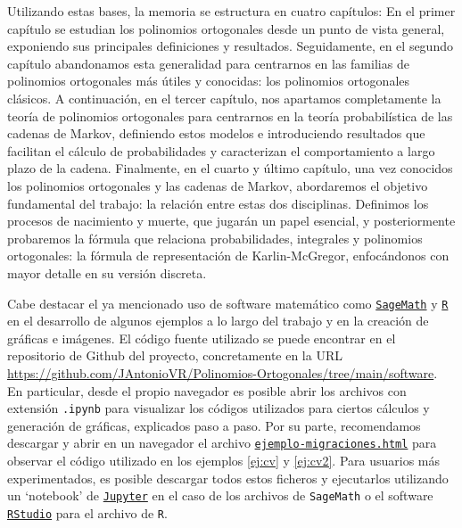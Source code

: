 Utilizando estas bases, la memoria se estructura en cuatro capítulos: En el primer capítulo se estudian los polinomios ortogonales desde un punto de vista general, exponiendo sus principales definiciones y resultados. Seguidamente, en el segundo capítulo abandonamos esta generalidad para centrarnos en las familias de polinomios ortogonales más útiles y conocidas: los polinomios ortogonales clásicos. A continuación, en el tercer capítulo, nos apartamos completamente la teoría de polinomios ortogonales para centrarnos en la teoría probabilística de las cadenas de Markov, definiendo estos modelos e introduciendo resultados que facilitan el cálculo de probabilidades y caracterizan el comportamiento a largo plazo de la cadena. Finalmente, en el cuarto y último capítulo, una vez conocidos los polinomios ortogonales y las cadenas de Markov, abordaremos el objetivo fundamental del trabajo: la relación entre estas dos disciplinas. Definimos los procesos de nacimiento y muerte, que jugarán un papel esencial, y posteriormente probaremos la fórmula que relaciona probabilidades, integrales y polinomios ortogonales: la fórmula de representación de Karlin-McGregor, enfocándonos con mayor detalle en su versión discreta.

Cabe destacar el ya mencionado uso de software matemático como \href{https://www.sagemath.org/}{\texttt{SageMath}} y \href{https://www.r-project.org/}{\texttt{R}} en el desarrollo de algunos ejemplos a lo largo del trabajo y en la creación de gráficas e imágenes. El código fuente utilizado se puede encontrar en el repositorio de Github del proyecto, concretamente en la URL \url{https://github.com/JAntonioVR/Polinomios-Ortogonales/tree/main/software}. En particular, desde el propio navegador es posible abrir los archivos con extensión \texttt{.ipynb} para visualizar los códigos utilizados para ciertos cálculos y generación de gráficas, explicados paso a paso. Por su parte, recomendamos descargar y abrir en un navegador el archivo \href{https://github.com/JAntonioVR/Polinomios-Ortogonales/blob/main/software/ejemplo-migraciones.html}{\texttt{ejemplo-migraciones.html}} para observar el código utilizado en los ejemplos \ref{ej:cv} y \ref{ej:cv2}. Para usuarios más experimentados, es posible descargar todos estos ficheros y ejecutarlos utilizando un `notebook' de \href{https://jupyter.org/}{\texttt{Jupyter}} en el caso de los archivos de \texttt{SageMath} o el software \href{https://posit.co/download/rstudio-desktop/}{\texttt{RStudio}} para el archivo de \texttt{R}.

